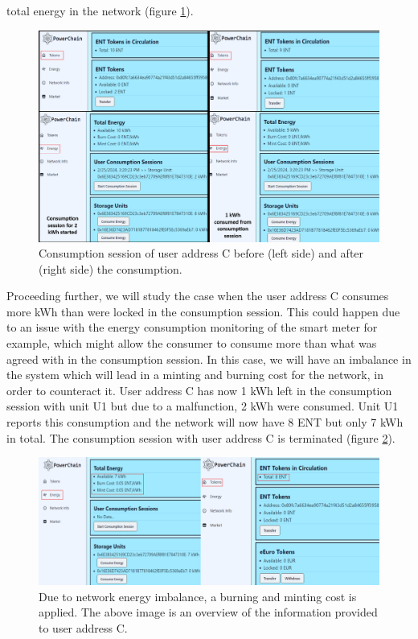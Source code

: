 total energy in the network (figure \ref{fig:consumption_session}).\\ 
\begin{figure}[h!]
    \centering
    \includegraphics[width=\linewidth,frame,scale=1]{Figures/consumption_session.png}
    \caption{Consumption session of user address C before (left side) and after (right side) the consumption.}
    \label{fig:consumption_session}
\end{figure}
Proceeding further, we will study the case when the user address C consumes more kWh than were locked in the consumption session. This could happen due to an issue with the energy consumption monitoring of the smart
meter for example, which might allow the consumer to consume more than what was agreed with in the consumption session. In this case, we will have an imbalance in the system which will lead in a minting and burning
cost for the network, in order to counteract it. User address C has now 1 kWh left in the consumption session with unit U1 but due to a malfunction, 2 kWh were consumed. Unit U1 reports this consumption and the network will now have
8 ENT but only 7 kWh in total. The consumption session with user address C is terminated (figure \ref{fig:energy_imbalance}). \\
\begin{figure}[h!]
    \centering
    \includegraphics[width=\linewidth,frame,scale=1]{Figures/energy_imbalance.png}
    \caption{Due to network energy imbalance, a burning and minting cost is applied. The above image is an overview of the information provided to user address C.}
    \label{fig:energy_imbalance}
\end{figure}
